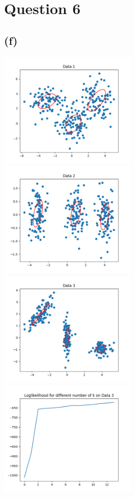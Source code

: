 \section*{Question 6}
\subsection*{(f)}
\graphicspath{{q6_expectation_maximization_python/}}
\includegraphics[width=0.5\textwidth]{Figure_1.png}
\includegraphics[width=0.5\textwidth]{Figure_2.png}
\includegraphics[width=0.5\textwidth]{Figure_3.png}
\includegraphics[width=0.5\textwidth]{Figure_4.png}

